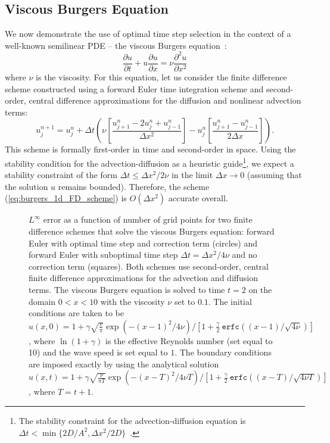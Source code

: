 \documentclass[fleqn,12pt,twoside]{article}
\newcommand{\beq}{\begin{equation}}
\newcommand{\eeq}{\end{equation}}
\def\pt{\partial t}
\def\px{\partial x}
\def\dt{\Delta t}
\def\dx{\Delta x}
\begin{document}
\subsection{Viscous Burgers Equation}
We now demonstrate the use of optimal time step selection in the context of 
a well-known semilinear PDE -- the viscous Burgers 
equation~\cite{whitham_book}:
\beq
  \frac{\partial u}{\pt} + u \frac{\partial u}{\px} = 
     \nu \frac{\partial^2 u}{\px^2} 
  \label{eq:burgers_1d}
\eeq
where $\nu$ is the viscosity.  For this equation, let us consider the finite
difference scheme constructed using a forward Euler time integration scheme
and second-order, central difference approximations for the diffusion and 
nonlinear advection terms:
\beq
  u^{n+1}_j = u^{n}_j 
  + \dt 
    \left( \nu 
      \left [ \frac{u^{n}_{j+1} -2 u^{n}_j + u^{n}_{j-1}}{\dx^2} \right]
         - u^n_j 
      \left[ \frac{u^{n}_{j+1} - u^{n}_{j-1}}{2 \dx} \right] 
    \right).
  \label{eq:burgers_1d_FD_scheme}
\eeq
This scheme is formally first-order in time and second-order in space.  
Using the stability condition for the advection-diffusion as a heuristic 
guide\footnote{The stability constraint for the advection-diffusion equation
is $\dt < \min \{2D/A^2, \dx^2/2D \}$~\cite{chan_1984}.}, 
we expect a stability constraint of the form $\dt \le \dx^2/2 \nu$ in the 
limit $\dx \rightarrow 0$ (assuming that the solution $u$ remains bounded).  
Therefore, the scheme (\ref{eq:burgers_1d_FD_scheme}) is $O(\dx^2)$ accurate 
overall. 

\begin{figure}[tb]
\begin{center}
\caption{$L^\infty$ error as a function of number of grid points for
two finite difference schemes that solve the viscous Burgers equation:
forward Euler with optimal time step and correction term (circles)
and forward Euler with suboptimal time step $\dt = \dx^2/4\nu$ and no 
correction term (squares).
Both schemes use second-order, central finite difference approximations for
the advection and diffusion terms.
The viscous Burgers equation is solved to time $t=2$ on the domain 
$0 < x < 10$ with the viscosity $\nu$ set to $0.1$.  The initial conditions are 
taken to be 
$u(x,0) = 1 + \gamma \sqrt{\frac{\nu}{\pi}} \exp\left( -(x-1)^2/4 \nu \right) 
            / \left[ 1 + \frac{\gamma}{2} \ 
                         \mathtt{erfc}\left((x-1)/\sqrt{4\nu} \right) 
    \right]$,
where $\ln(1+\gamma)$ is the effective Reynolds number (set equal to 10) and 
the wave speed is set equal to $1$.  The boundary conditions are imposed 
exactly by using
the analytical solution
$u(x,t) = 1 + \gamma \sqrt{\frac{\nu}{\pi T}} 
              \exp\left( -(x-T)^2/4 \nu T \right) 
            / \left[ 1 + \frac{\gamma}{2} \ 
                         \mathtt{erfc}\left((x-T)/\sqrt{4\nu T} \right) 
    \right]$,
where $T = t+1$.
}
\label{fig:burgers_1d_error}
\end{center}
\end{figure}
\end{document}
